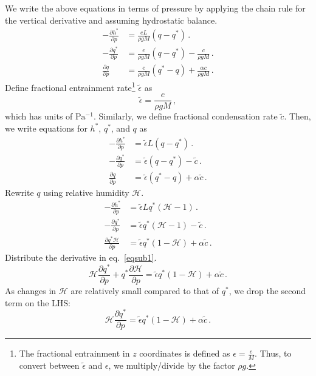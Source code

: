 \documentclass{article}
\begin{document}
We write the above equations in terms of pressure by applying the chain rule for the vertical derivative and assuming hydrostatic balance. 
\begin{align}
-\frac{\partial h^*}{\partial p} &= \frac{eL}{\rho gM}(q - q^*) \, . \\
-\frac{\partial q^*}{\partial p} &= \frac{e}{\rho gM}(q - q^*) - \frac{c}{\rho gM} \, . \\
\frac{\partial q}{\partial p} &= \frac{e}{\rho gM}(q^* - q) + \frac{\alpha c}{\rho gM} \, .
\end{align}
Define fractional entrainment rate\footnote{The fractional entrainment in $z$ coordinates is defined as $\epsilon = \frac{e}{M}$. Thus, to convert between $\tilde{\epsilon}$ and $\epsilon$, we multiply/divide by the factor $\rho g$.} $\tilde{\epsilon}$ as
\begin{equation}
\tilde{\epsilon} = \frac{e}{\rho gM} \, ,
\end{equation}
which has units of $\mathrm{Pa^{-1}}$. Similarly, we define fractional condensation rate $\tilde{c}$. Then, we write equations for $h^*$, $q^*$, and $q$ as
\begin{align}
-\frac{\partial h^*}{\partial p} &= \tilde{\epsilon}L(q - q^*) \, . \\
-\frac{\partial q^*}{\partial p} &= \tilde{\epsilon}(q - q^*) - \tilde{c} \, . \\
\frac{\partial q}{\partial p} &= \tilde{\epsilon}(q^* - q) + \alpha\tilde{c} \, .
\end{align}
Rewrite $q$ using relative humidity $\mathcal{H}$.
\begin{align}
\label{eqh1}
-\frac{\partial h^*}{\partial p} &= \tilde{\epsilon}Lq^*(\mathcal{H} - 1) \, . \\
\label{eqconv1}
-\frac{\partial q^*}{\partial p} &= \tilde{\epsilon}q^*(\mathcal{H} - 1) - \tilde{c} \, . \\
\label{eqsub1}
\frac{\partial q^* \mathcal{H}}{\partial p} &= \tilde{\epsilon}q^*(1 - \mathcal{H}) + \alpha\tilde{c} \, .
\end{align}
Distribute the derivative in eq.~\ref{eqsub1}.
\begin{equation}
\mathcal{H}\frac{\partial q^*}{\partial p} + q^*\frac{\partial \mathcal{H}}{\partial p} = \tilde{\epsilon}q^*(1 - \mathcal{H}) + \alpha\tilde{c} \, .
\end{equation}
As changes in $\mathcal{H}$ are relatively small compared to that of $q^*$, we drop the second term on the LHS:
\begin{equation}
\label{eqsub2}
\mathcal{H}\frac{\partial q^*}{\partial p} = \tilde{\epsilon}q^*(1 - \mathcal{H}) + \alpha\tilde{c} \, .
\end{equation}
\end{document}

